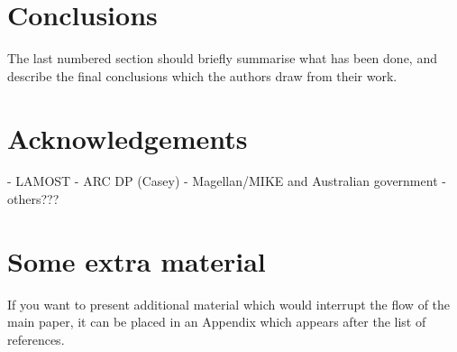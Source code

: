 \documentclass[a4paper,fleqn,usenatbib]{mnras}
\begin{document}
\section{Conclusions}

The last numbered section should briefly summarise what has been done, and describe
the final conclusions which the authors draw from their work.

\section*{Acknowledgements}

- LAMOST
- ARC DP (Casey)
- Magellan/MIKE and Australian government
- others???











\appendix

\section{Some extra material}

If you want to present additional material which would interrupt the flow of the main paper,
it can be placed in an Appendix which appears after the list of references.



\bsp	%
\label{lastpage}
\end{document}
